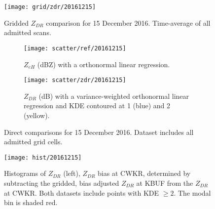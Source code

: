 \begin{figure}[p]
\texttt{[image: grid/zdr/20161215]}
\caption{Gridded $Z_{DR}$ comparison for 15 December 2016. Time-average of all admitted scans.} 
\label{fig:grid_zdr_20161215}
\end{figure}

\begin{figure}[p]
\centering
   \begin{subfigure}[t]{0.48\linewidth} \centering
     \texttt{[image: scatter/ref/20161215]}
     \caption{$Z_{eH}$ (dBZ) with a orthonormal linear regression.}\label{fig:scatter_ref_20161215}
   \end{subfigure}
   \begin{subfigure}[t]{0.48\linewidth} \centering
     \texttt{[image: scatter/zdr/20161215]}
     \caption{$Z_{DR}$ (dB) with a variance-weighted orthonormal linear regression and KDE contoured at 1 (blue) and 2 (yellow).}\label{fig:scatter_zdr_20161215}
   \end{subfigure}
\caption{Direct comparisons for 15 December 2016. Dataset includes all admitted grid cells.} \label{fig:scatter_20161215}
\end{figure}

\begin{figure}[H]
\texttt{[image: hist/20161215]}\centering
\caption{Histograms of $Z_{DR}$ (left), $Z_{DR}$ bias at CWKR, determined by subtracting the gridded, bias adjusted $Z_{DR}$ at KBUF from the $Z_{DR}$ at
CWKR. Both datasets include points with KDE $\geq 2$. The modal bin is shaded red. } 
\label{fig:hist_20161215}
\end{figure}

